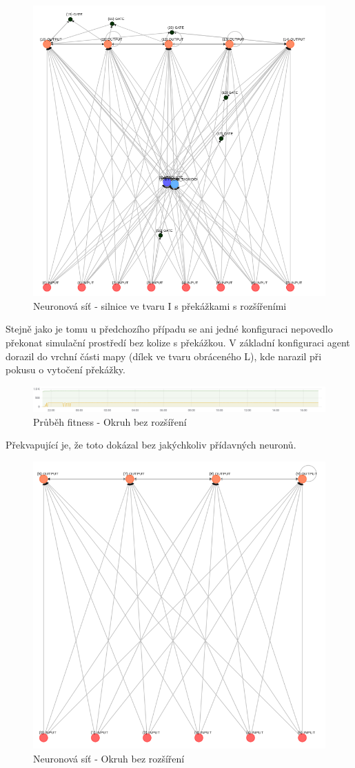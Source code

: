 \begin{figure}[H]
	\centering
	\includegraphics[width=0.7\linewidth]{solutions/IWithObstructions/advanced}
	\caption{Neuronová síť - silnice ve tvaru I s překážkami s rozšířeními}
	\label{fig:advanced}
\end{figure}

Stejně jako je tomu u předchozího případu se ani jedné konfiguraci nepovedlo překonat simulační prostředí bez kolize s překážkou.
V základní konfiguraci agent dorazil do vrchní části mapy (dílek ve tvaru obráceného L), kde narazil při pokusu o vytočení překážky.
\begin{figure}[H]
	\centering
	\includegraphics[width=0.5\linewidth]{solutions/Iadvanced/basicGraph}
	\caption{Průběh fitness - Okruh bez rozšíření}
	\label{fig:basicgraph}
\end{figure}
Překvapující je, že toto dokázal bez jakýchkoliv přídavných neuronů.

\begin{figure}
	\centering
	\includegraphics[width=0.5\linewidth]{solutions/Iadvanced/basic}
	\caption{Neuronová síť - Okruh bez rozšíření}
	\label{fig:basic}
\end{figure}

